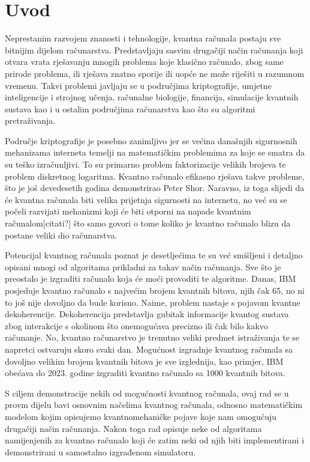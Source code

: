 \chapter{Uvod}
\label{ch:uvod}
Neprestanim razvojem znanosti i tehnologije, kvantna računala postaju sve bitnijim dijelom računarstva. Predstavljaju sasvim drugačiji način računanja koji otvara vrata rješavanju mnogih problema koje klasično računalo, zbog same prirode problema, ili rješava znatno sporije ili uopće ne može riješiti u razumnom vremenu. Takvi problemi javljaju se u područjima kriptografije, umjetne inteligencije i strojnog učenja, računalne biologije, financija, simulacije kvantnih sustava kao i u ostalim područjima računarstva kao što su algoritmi pretraživanja.

Područje kriptografije je posebno zanimljivo jer se većina današnjih sigurnosnih mehanizama interneta temelji na matematičkim problemima za koje se smatra da su teško izračunljivi. To su primarno problem faktorizacije velikih brojeva te problem diskretnog logaritma. Kvantno računalo efikasno rješava takve probleme, što je još devedesetih godina demonstrirao Peter Shor\citep{Shor:1994jg}. Naravno, iz toga slijedi da će kvantna računala biti velika prijetnja sigurnosti na internetu, no već su se počeli razvijati mehanizmi koji će biti otporni na napade kvantnim računalom[citati?] što  samo govori o tome koliko je kvantno računalo blizu da postane veliki dio računarstva.

Potencijal kvantnog računala poznat je desetljećima te su već smišljeni i detaljno opisani mnogi od algoritama prikladni za takav način računanja. Sve što je preostalo je izgraditi računalo koja će moći provoditi te algoritme. Danas, IBM posjeduje kvantno računalo s najvećim brojem kvantnih bitova, njih čak 65, no ni to još nije dovoljno da bude korisno. Naime, problem nastaje s pojavom kvantne dekoherencije. Dekoherencija predstavlja gubitak informacije kvantog sustava zbog interakcije s okolinom što onemogućava precizno ili čak bilo kakvo računanje. No, kvantno računarstvo je trenutno veliki predmet istraživanja te se napretci ostvaruju skoro svaki dan. Mogućnost izgradnje kvantnog računala sa dovoljno velikim brojem kvantnih bitova je sve izglednija, kao primjer, IBM obećava do 2023. godine izgraditi kvantno računalo sa 1000 kvantnih bitova\citep{ibm:quantum}.

S ciljem demonstracije nekih od mogućnosti kvantnog računala, ovaj rad se u provm dijelu bavi osnovnim načelima kvantnog računala, odnosno matematičkim modelom kojim opisujemo kvantnomehaničke pojave koje nam omogućuju drugačiji način računanja. Nakon toga rad opisuje neke od algoritama namijenjenih za kvantno računalo koji će zatim neki od njih biti implementirani i demonstrirani u samostalno izgrađenom simulatoru.